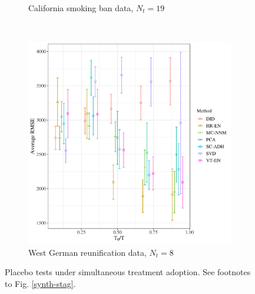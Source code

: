 \documentclass[12pt]{article}
\begin{document}
\begin{figure}[htbp]
\begin{subfigure}[t]{0.48\textwidth}
		\caption{California smoking ban data, $N_t = 19$}
	\end{subfigure}
	~
	\begin{subfigure}[t]{0.48\textwidth}
		\centering
		\includegraphics[width=\textwidth]{plots/germany_N_16_T_44_numruns_20_num_treated_8_simultaneuous_1.png}
		\caption{West German reunification data, $N_t = 8$} 
	\end{subfigure}
	\caption{Placebo tests under simultaneous treatment adoption. See footnotes to Fig. \ref{synth-stag}. \label{synth-sim}} 
\end{figure}
\end{document}
